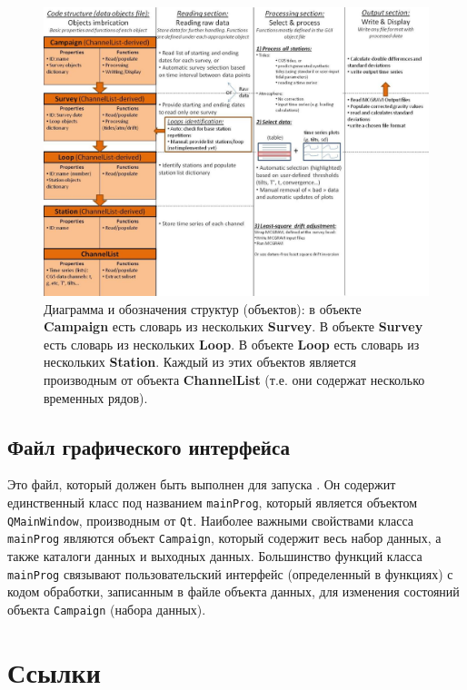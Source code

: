 \begin{figure}
    \includegraphics[width=\textwidth]{figures/pygrav_chart_and_structures_imbrications}
    \caption{Диаграмма \pg{} и обозначения структур (объектов): в объекте
    \textbf{Campaign} есть словарь из нескольких \textbf{Survey}. В объекте \textbf{Survey} есть словарь
    из нескольких \textbf{Loop}. В объекте \textbf{Loop} есть словарь из нескольких \textbf{Station}.
    Каждый из этих объектов является производным от объекта \textbf{ChannelList} (т.е.
    они содержат несколько временных рядов).}
    \label{fig:pygrav_chart_and_structures_imbrications}
\end{figure}

\subsection[Файл графического интерфейса]{Файл графического интерфейса}
\label{subsec:gui_file}

Это файл, который должен быть выполнен для запуска \pg{}. Он содержит
единственный класс под названием \verb|mainProg|, который является объектом
\verb|QMainWindow|, производным от \verb|Qt|. Наиболее важными свойствами класса
\verb|mainProg| являются объект \verb|Campaign|, который содержит весь набор
данных, а также каталоги данных и выходных данных. Большинство функций класса
\verb|mainProg| связывают пользовательский интерфейс (определенный в функциях) с
кодом обработки, записанным в файле объекта данных, для изменения состояний
объекта \verb|Campaign| (набора данных).

\section*{Ссылки}

